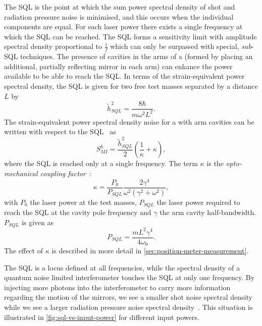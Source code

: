 The \gls{SQL} is the point at which the sum power spectral density of shot and radiation pressure noise is minimised, and this occurs when the individual components are equal. For each laser power there exists a single frequency at which the \gls{SQL} can be reached. The \gls{SQL} forms a sensitivity limit with amplitude spectral density proportional to $\frac{1}{f}$ which can only be surpassed with special, \emph{sub}-\gls{SQL} techniques. The presence of cavities in the arms of a \MI{} (formed by placing an additional, partially reflecting mirror in each arm) can enhance the power available to be able to reach the \gls{SQL}. In terms of the strain-equivalent power spectral density, the \gls{SQL} is given for two free test masses separated by a distance $L$ by~\cite{Braginsky1996}
\begin{equation}
  \label{eq:strainsql}
  \tilde{h}^2_{SQL} = \frac{8 \hbar}{m \omega^2 L^2}.
\end{equation}
The strain-equivalent power spectral density noise for a \MI{} with arm cavities can be written with respect to the \gls{SQL}~\cite{Kimble2001} as
\begin{equation}
  \label{eq:classicalifospectrum}
  S^{h}_{MI} = \frac{\tilde{h}^{2}_{SQL}}{2} \left( \frac{1}{\kappa} + \kappa \right),
\end{equation}
where the \gls{SQL} is reached only at a single frequency. The term $\kappa$ is the \emph{opto-mechanical coupling factor}~\cite{Kimble2001}:
\begin{equation}
 \kappa = \frac{P_0}{P_{SQL}} \frac{2 \gamma^4}{\omega^2 \left( \gamma^2 + \omega^2 \right)},
 \label{eq:optomechanicalcoupling}
\end{equation}
with $P_0$ the laser power at the test masses, $P_{SQL}$ the laser power required to reach the \gls{SQL} at the cavity pole frequency and $\gamma$ the arm cavity half-bandwidth. $P_{SQL}$ is given as~\cite{Kimble2001}
\begin{equation}
 P_{SQL} = \frac{m L^2 \gamma^4}{4 \omega_0}.
\end{equation}
The effect of $\kappa$ is described in more detail in \cref{sec:position-meter-measurement}.

The \gls{SQL} is a locus defined at all frequencies, while the spectral density of a quantum noise limited interferometer touches the \gls{SQL} at only one frequency. By injecting more photons into the interferometer to carry more information regarding the motion of the mirrors, we see a smaller shot noise spectral density while we see a larger radiation pressure noise spectral density~\cite{Caves1981}. This situation is illustrated in \cref{fig:sql-vs-input-power} for different input powers.

